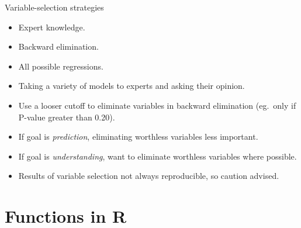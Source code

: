 \documentclass[unknownkeysallowed]{beamer}\usepackage[]{graphicx}\usepackage[]{color}
\begin{document}
\begin{frame}[fragile]{Variable-selection strategies}

  \begin{itemize}
  \item Expert knowledge.
  \item Backward elimination.
  \item All possible regressions.
  \item Taking a variety of models to experts and asking their opinion.
  \item Use a looser cutoff to eliminate variables in backward
    elimination (eg.\ only if P-value greater than 0.20).
  \item If goal is \emph{prediction}, eliminating worthless variables
    less important.
  \item If goal is \emph{understanding}, want to eliminate worthless
    variables where possible.
  \item Results of variable selection not always reproducible, so
    caution advised.
  \end{itemize}
  
\end{frame}





\section{Functions in R}

\frame{\sectionpage} 
\end{document}
